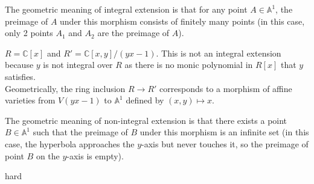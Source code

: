 \documentclass[15pt]{scrartcl}
\newcommand{\A}{\mathbb{A}}
\newcommand{\C}{\mathbb{C}}
\begin{document}
\begin{itemize}
\begin{example}
    The geometric meaning of integral extension is that for any point $A\in \A^1$, the preimage of $A$ under this morphism consists of finitely many points (in this case, only 2 points $A_1$ and $A_2$ are the preimage of $A$). 
    \end{example}
    \begin{example}
        $R=\C[x]$ and $R'=\C[x,y]/(yx-1)$. This is not an integral extension because $y$ is not integral over $R$ as there is no monic polynomial in $R[x]$ that $y$ satisfies.
        \\
        Geometrically, the ring inclusion $R \to R'$ corresponds to a morphism of affine varieties from $V(yx-1)$ to $\A^1$ defined by $(x,y)\mapsto x$.
        \begin{center}
            
        \end{center}
    The geometric meaning of non-integral extension is that there exists a point $B\in \A^1$ such that the preimage of $B$ under this morphism is an infinite set (in this case, the hyperbola approaches the $y$-axis but never touches it, so the preimage of point $B$ on the $y$-axis is empty).
    \end{example}
hard
\end{itemize}
\end{document}
